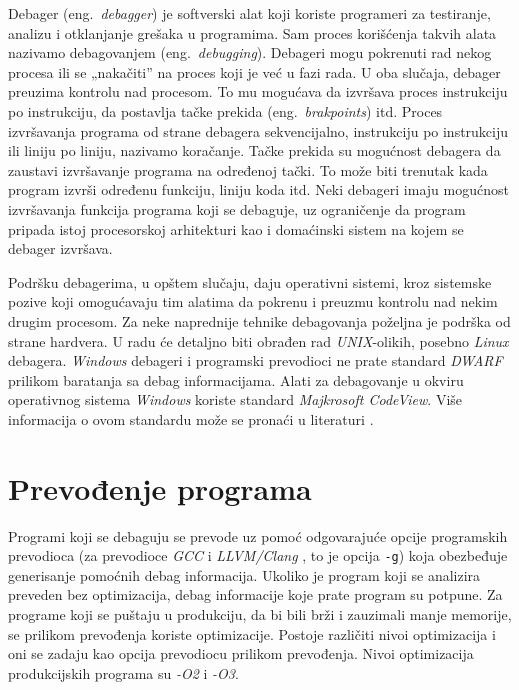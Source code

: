 \documentclass[12pt,oneside]{memoir}
\begin{document}
Debager (eng.~\emph{debagger}) je softverski alat koji koriste programeri za testiranje, analizu i otklanjanje grešaka u programima. Sam proces korišćenja takvih alata nazivamo debagovanjem (eng.~\emph{debugging}).
Debageri mogu pokrenuti rad nekog procesa ili se „nakačiti” na proces koji je već u fazi rada. U oba slučaja, debager preuzima kontrolu nad procesom. To mu mogućava da izvršava proces instrukciju po instrukciju, da postavlja tačke prekida (eng.~\emph{brakpoints}) itd. Proces izvršavanja programa od strane debagera sekvencijalno, instrukciju po instrukciju ili liniju po liniju, nazivamo koračanje. Tačke prekida su mogućnost debagera da zaustavi izvršavanje programa na određenoj tački. To može biti trenutak kada program izvrši određenu funkciju, liniju koda itd. Neki debageri imaju mogućnost izvršavanja funkcija programa koji se debaguje, uz ograničenje da program pripada istoj procesorskoj arhitekturi kao i domaćinski sistem na kojem se debager izvršava.

Podršku debagerima, u opštem slučaju, daju operativni sistemi, kroz sistemske pozive koji omogućavaju tim alatima da pokrenu i preuzmu kontrolu nad nekim drugim procesom. Za neke naprednije tehnike debagovanja poželjna je podrška od strane hardvera. U radu će detaljno biti obrađen rad \emph{UNIX}-olikih, posebno \emph{Linux} debagera. \emph{Windows} debageri i programski prevodioci ne prate standard \emph{DWARF} \cite{DWARF} prilikom baratanja sa debag informacijama. Alati za debagovanje u okviru operativnog sistema \emph{Windows} koriste standard \emph{Majkrosoft CodeView}.  Više informacija o ovom standardu može se pronaći u literaturi \cite{CodeView}.

\section{Prevođenje programa}

Programi koji se debaguju se prevode uz pomoć odgovarajuće opcije programskih prevodioca (za prevodioce \emph{GCC} \cite{GCC} i \emph{LLVM/Clang} \cite{LLVM}, to je opcija \texttt{-g}) koja obezbeđuje generisanje pomoćnih debag informacija. Ukoliko je program koji se analizira preveden bez optimizacija, debag informacije koje prate program su potpune. Za programe koji se puštaju u produkciju, da bi bili brži i zauzimali manje memorije, se prilikom prevođenja koriste optimizacije. Postoje različiti nivoi optimizacija i oni se zadaju kao opcija prevodiocu prilikom prevođenja. Nivoi optimizacija produkcijskih programa su \emph{-O2} i \emph{-O3}.
\end{document}
